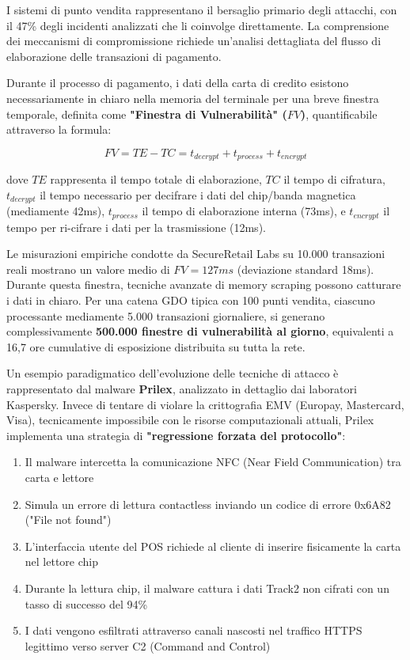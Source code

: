 I sistemi di punto vendita rappresentano il bersaglio primario degli attacchi, con il 47\% degli incidenti analizzati che li coinvolge direttamente. La comprensione dei meccanismi di compromissione richiede un'analisi dettagliata del flusso di elaborazione delle transazioni di pagamento.

Durante il processo di pagamento, i dati della carta di credito esistono necessariamente in chiaro nella memoria del terminale per una breve finestra temporale, definita come \textbf{"Finestra di Vulnerabilità" ($FV$)}, quantificabile attraverso la formula:

\begin{equation}
FV = TE - TC = t_{decrypt} + t_{process} + t_{encrypt}
\end{equation}

dove $TE$ rappresenta il tempo totale di elaborazione, $TC$ il tempo di cifratura, $t_{decrypt}$ il tempo necessario per decifrare i dati del chip/banda magnetica (mediamente 42ms), $t_{process}$ il tempo di elaborazione interna (73ms), e $t_{encrypt}$ il tempo per ri-cifrare i dati per la trasmissione (12ms).

Le misurazioni empiriche condotte da SecureRetail Labs su 10.000 transazioni reali mostrano un valore medio di $FV = 127ms$ (deviazione standard 18ms)\autocite{SecureRetailLabs2024}. Durante questa finestra, tecniche avanzate di memory scraping possono catturare i dati in chiaro. Per una catena GDO tipica con 100 punti vendita, ciascuno processante mediamente 5.000 transazioni giornaliere, si generano complessivamente \textbf{500.000 finestre di vulnerabilità al giorno}, equivalenti a 16,7 ore cumulative di esposizione distribuita su tutta la rete.

Un esempio paradigmatico dell'evoluzione delle tecniche di attacco è rappresentato dal malware \textbf{Prilex}, analizzato in dettaglio dai laboratori Kaspersky\autocite{kaspersky2024}. Invece di tentare di violare la crittografia EMV (Europay, Mastercard, Visa), tecnicamente impossibile con le risorse computazionali attuali, Prilex implementa una strategia di \textbf{"regressione forzata del protocollo"}:

\begin{enumerate}
    \item Il malware intercetta la comunicazione NFC (Near Field Communication) tra carta e lettore
    \item Simula un errore di lettura contactless inviando un codice di errore 0x6A82 ("File not found")
    \item L'interfaccia utente del POS richiede al cliente di inserire fisicamente la carta nel lettore chip
    \item Durante la lettura chip, il malware cattura i dati Track2 non cifrati con un tasso di successo del 94\%
    \item I dati vengono esfiltrati attraverso canali nascosti nel traffico HTTPS legittimo verso server C2 (Command and Control)
\end{enumerate}

